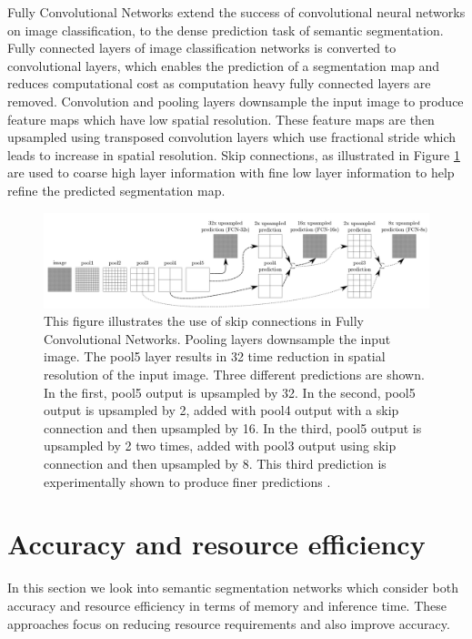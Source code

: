 Fully Convolutional Networks \cite{DBLP:journals/corr/LongSD14} extend the success of convolutional neural networks on image classification, to the dense prediction task of semantic segmentation. Fully connected layers of image classification networks is converted to convolutional layers, which enables the prediction of a segmentation map and reduces computational cost as computation heavy fully connected layers are removed. Convolution and pooling layers downsample the input image to produce feature maps which have low spatial resolution. These feature maps are then upsampled using transposed convolution layers which use fractional stride which leads to increase in spatial resolution. Skip connections, as illustrated in Figure \ref{Fig:fcn} are used to coarse high layer information with fine low layer information to help refine the predicted segmentation map. 

	\begin{figure}[h]
		\centering
		\includegraphics[width=1\linewidth]{images/fcn_skip}
		\caption{This figure illustrates the use of skip connections in Fully Convolutional Networks. Pooling layers downsample the input image. The pool5 layer results in 32 time reduction in spatial resolution of the input image. Three different predictions are shown. In the first, pool5 output is upsampled by 32. In the second, pool5 output is upsampled by 2, added with pool4 output with a skip connection and then upsampled by 16. In the third, pool5 output is upsampled by 2 two times, added with pool3 output using skip connection and then upsampled by 8. This third prediction is experimentally shown to produce finer predictions \cite{DBLP:journals/corr/LongSD14}.}
		\label{Fig:fcn}
	\end{figure}

\section{Accuracy and resource efficiency}
\label{section:acceff}

In this section we look into semantic segmentation networks which consider both accuracy and resource efficiency in terms of memory and inference time. These approaches focus on reducing resource requirements and also improve accuracy.


